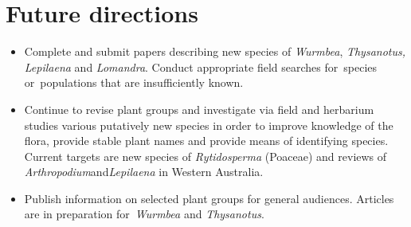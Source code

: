 \documentclass[version=last,
    paper=a4, %
    10pt, %
    usenames,
    dvipsnames,
    oneside, %
    headings=openany, %
    DIV=15 %
]{scrbook}
\begin{document}
\section*{Future directions}
\begin{itemize}
\itemsep1pt\parskip0pt
\item
  Complete and submit papers describing new species of \emph{Wurmbea},
  \emph{Thysanotus, Lepilaena} and \emph{Lomandra}. Conduct appropriate
  field searches for~species or~populations that are insufficiently
  known.
\item
  Continue to revise plant groups and investigate via field and
  herbarium studies various putatively new species in order to improve
  knowledge of the flora, provide stable plant names and provide means
  of identifying species. Current targets are new species of
  \emph{Rytidosperma} (Poaceae) and reviews of
  \emph{Arthropodium}and\emph{Lepilaena} in Western Australia.
\item
  Publish information on selected plant groups for general audiences.
  Articles are in preparation for~\emph{Wurmbea} and \emph{Thysanotus}.
\end{itemize}



\end{document}
